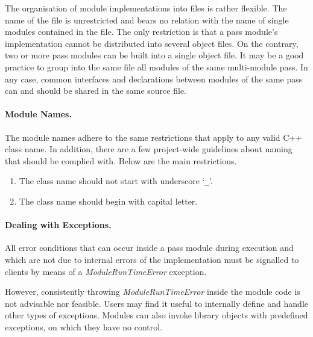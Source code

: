\documentclass[a4paper,twoside]{tce}
\begin{document}
The organisation of module implementations into files is rather flexible.
The name of the file is unrestricted and bears no relation with the name of
single modules contained in the file.
%
The only restriction is that a pass module's implementation cannot be
distributed into several object files.
%
On the contrary, two or more pass modules can be built into a single object
file. It may be a good practice to group into the same file all modules of
the same multi-module pass.
%
In any case, common interfaces and declarations between modules of the same
pass can and should be shared in the same source file.

\paragraph{Module Names.}

The module names adhere to the same restrictions that apply to any valid C++
class name. In addition, there are a few project-wide guidelines about
naming that should be complied with. Below are the main restrictions.
\begin{enumerate}
\item The class name should not start with underscore `\verb|_|'.
\item The class name should begin with capital letter.
\end{enumerate}

\paragraph{Dealing with Exceptions.}

All error conditions that can occur inside a pass module during execution
and which are not due to internal errors of the implementation must be
signalled to clients by means of a \emph{ModuleRunTimeError} exception.

However, consistently throwing \emph{ModuleRunTimeError} inside the module
code is not advisable nor feasible.
%
Users may find it useful to internally define and handle other types of
exceptions. Modules can also invoke library objects with predefined
exceptions, on which they have no control.
\end{document}
